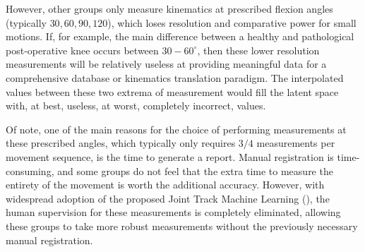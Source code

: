 However, other groups only measure kinematics at prescribed flexion angles (typically $30,60,90,120$), which loses resolution and comparative power for small motions.
If, for example, the main difference between a healthy and pathological post-operative knee occurs between $30-60^{\circ}$, then these lower resolution measurements will be relatively useless at providing meaningful data for a comprehensive database or kinematics translation paradigm.
The interpolated values between these two extrema of measurement would fill the latent space with, at best, useless, at worst, completely
incorrect, values.

Of note, one of the main reasons for the choice of performing measurements at these prescribed angles, which typically only requires $3/4$ measurements per movement sequence, is the time to generate a report.
Manual registration is time-consuming, and some groups do not feel that the extra time to measure the entirety of the movement is worth the additional accuracy.
However, with widespread adoption of the proposed Joint Track Machine Learning (), the human supervision for these measurements is completely eliminated, allowing these groups to take more robust measurements without the previously necessary manual registration.



